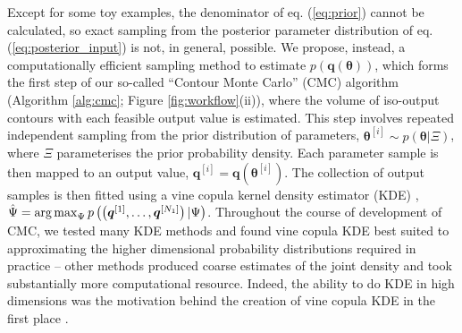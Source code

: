 Except for some toy examples, the denominator of eq. (\ref{eq:prior}) cannot be calculated, so exact sampling from the posterior parameter distribution of eq. (\ref{eq:posterior_input}) is not, in general, possible. We propose, instead, a computationally efficient sampling method to estimate $p(\boldsymbol{q}(\boldsymbol{\theta}))$, which forms the first step of our so-called ``Contour Monte Carlo'' (CMC) algorithm (Algorithm \ref{alg:cmc}; Figure \ref{fig:workflow}(ii)), where the volume of iso-output contours with each feasible output value is estimated. This step involves repeated independent sampling from the prior distribution of parameters, $\boldsymbol{\theta}^{[i]}\sim p(\boldsymbol{\theta}|\Xi)$, where $\Xi$ parameterises the prior probability density.
Each parameter sample is then mapped to an output value, $\boldsymbol{q}^{[i]}=\boldsymbol{q}(\boldsymbol{\theta}^{[i]})$. The collection of output samples is then fitted using a vine copula kernel density estimator (KDE) \cite{nagler2016evading}, $\hat{\Psi} = \operatorname*{arg\,max}_\Psi p\left(\left( \boldsymbol{q}^{[1]}, \dots ,\boldsymbol{q}^{[N_1]} \right)|\Psi\right)$. Throughout the course of development of CMC, we tested many KDE methods and found vine copula KDE best suited to approximating the higher dimensional probability distributions required in practice -- other methods produced coarse estimates of the joint density and took substantially more computational resource. Indeed, the ability to do KDE in high dimensions was the motivation behind the creation of vine copula KDE in the first place \cite{nagler2016evading}. 


